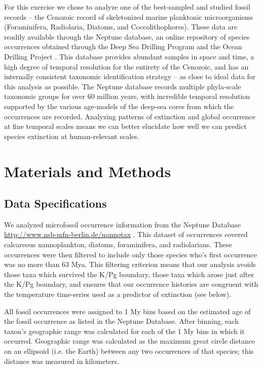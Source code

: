 \documentclass[12pt,letterpaper]{article}
\begin{document}
\begin{refsection}
For this exercise we chose to analyze one of the best-sampled and studied fossil records -- the Cenozoic record of skeletonized marine planktonic microorganisms (Foraminifera, Radiolaria, Diatoms, and Coccolithophores). These data are readily available through the Neptune database, an online repository of species occurrences obtained through the Deep Sea Drilling Program and the Ocean Drilling Project \citep{Lazarus1994,SpencerCervato1999}. This database provides abundant samples in space and time, a high degree of temporal resolution for the entirety of the Cenozoic, and has an internally consistent taxonomic identification strategy -- as close to ideal data for this analysis as possible. The Neptune database records multiple phyla-scale taxonomic groups for over 60 million years, with incredible temporal resolution supported by the various age-models of the deep-sea cores from which the occurrences are recorded. Analyzing patterns of extinction and global occurrence at fine temporal scales means we can better elucidate how well we can predict species extinction at human-relevant scales.



\section{Materials and Methods}

\subsection{Data Specifications}

We analyzed microfossil occurrence information from the Neptune Database \url{http://www.nsb-mfn-berlin.de/nannotax} \citep{Lazarus1994,SpencerCervato1999}. This dataset of occurrences covered calcareous nannoplankton, diatoms, foraminifera, and radiolarians.%
These occurrences were then filtered to include only those species who's first occurrence was no more than 63 Mya. This filtering criterion means that our analysis avoids those taxa which survived the K/Pg boundary, those taxa which arose just after the K/Pg boundary, and ensures that our occurrence histories are congruent with the temperature time-series used as a predictor of extinction (see below). 

All fossil occurrences were assigned to 1 My bins based on the estimated age of the fossil occurrence as listed in the Neptune Database. After binning, each taxon's geographic range was calculated for each of the 1 My bins in which it occurred. Geographic range was calculated as the maximum great circle distance on an ellipsoid (i.e. the Earth) between any two occurrences of that species; this distance was measured in kilometers. 


\end{refsection}
\end{document}
